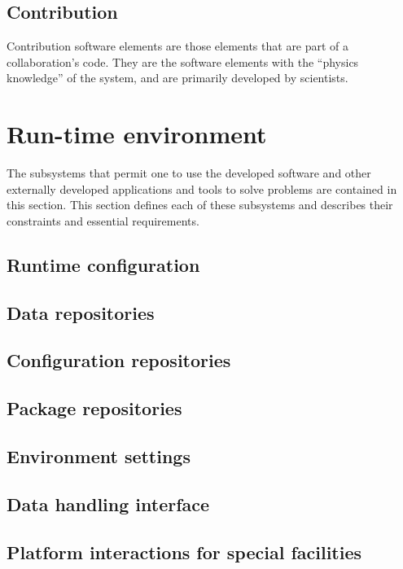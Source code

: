 \documentclass[draftmode,draftwater]{memarticle}
\begin{document}
\subsection{Contribution}

Contribution software elements are those elements that are part of a
collaboration's code. They are the software elements with the ``physics
knowledge'' of the system, and are primarily developed by scientists.

\section{Run-time environment}

The subsystems that permit one to use the developed software and other
externally developed applications and tools to solve problems are
contained in this section. This section defines each of these subsystems
and describes their constraints and essential requirements.

\subsection{Runtime configuration}

\subsection{Data repositories}

\subsection{Configuration repositories}

\subsection{Package repositories}

\subsection{Environment settings}

\subsection{Data handling interface}

\subsection{Platform interactions for special facilities}
\end{document}
